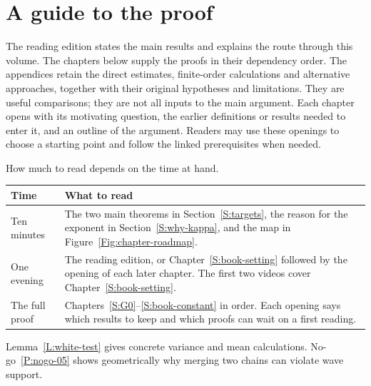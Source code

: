 \documentclass[12pt,oneside,openany]{book}
\numberwithin{equation}{section}
\theoremstyle{nogostyle}
\theoremstyle{definition}
\begin{document}
\tableofcontents
\listoffigures

\chapter*{A guide to the proof}

The reading edition states the main results and explains the route through
this volume. The chapters below supply the proofs in their dependency order.
The appendices retain the direct estimates, finite-order calculations and
alternative approaches, together with their original hypotheses and limitations.
They are useful comparisons; they are not all inputs to the main argument. Each
chapter opens with its motivating question, the earlier definitions or results
needed to enter it, and an outline of the argument. Readers may use these
openings to choose a starting point and follow the linked prerequisites when
needed.

How much to read depends on the time at hand.

\begin{center}
\begin{tabular}{@{}p{}p{}@{}}
  \toprule
  Time & What to read \\
  \midrule
  Ten minutes & The two main theorems in Section~\ref{S:targets}, the reason for the exponent in Section~\ref{S:why-kappa}, and the map in Figure~\ref{Fig:chapter-roadmap}. \\
  One evening & The reading edition, or Chapter~\ref{S:book-setting} followed by the opening of each later chapter. The first two videos cover Chapter~\ref{S:book-setting}. \\
  The full proof & Chapters~\ref{S:G0}--\ref{S:book-constant} in order. Each opening says which results to keep and which proofs can wait on a first reading. \\
  \bottomrule
\end{tabular}
\end{center}

Lemma~\ref{L:white-test} gives concrete variance and mean calculations.
No-go~\ref{P:nogo-05} shows geometrically why merging two chains can violate
wave support.
\end{document}
